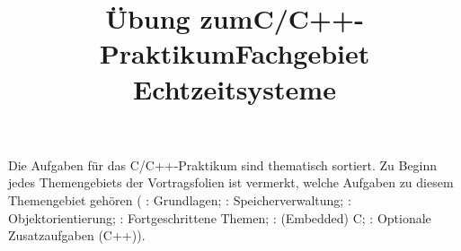 

\title{Übung zum\linebreak[1]C/C++-Praktikum\linebreak[1] Fachgebiet Echtzeitsysteme}

\setcounter{section}{0}



\maketitle

\noindent Die Aufgaben für das C/C++-Praktikum sind thematisch sortiert.
Zu Beginn jedes Themengebiets der Vortragsfolien ist vermerkt, welche Aufgaben zu diesem Themengebiet gehören (%
\ExercisePrefixBasics: Grundlagen; 
\ExercisePrefixMemory: Speicherverwaltung;
\ExercisePrefixObjectOrientation: Objektorientierung;
\ExercisePrefixAdvanced: Fortgeschrittene Themen;
\ExercisePrefixEmbeddedC: (Embedded) C;
\ExercisePrefixElevator: Optionale Zusatzaufgaben (C++)).
%
\setcounter{tocdepth}{1}
\setlength\cftsecnumwidth{10em}
\setlength\cftbeforesecskip{.1em} %
\tableofcontents

\vspace*{\fill}
\cclicense

\newpage







\newpage

\newpage

\newpage


\newpage
{}



\newpage

\newpage

\newpage

\newpage

\newpage


